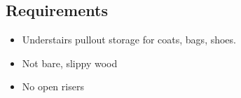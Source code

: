 \subsection{Requirements}
\begin{itemize}
\item Understairs pullout storage for coats, bags, shoes.
\item Not bare, slippy wood
\item No open risers
\end{itemize}
